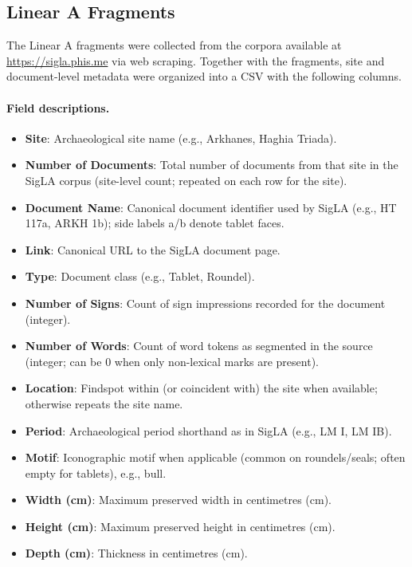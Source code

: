 \subsection{Linear A Fragments}
The Linear A fragments were collected from the corpora available at \url{https://sigla.phis.me} via web scraping.
Together with the fragments, site and document-level metadata were organized into a CSV with the following columns.

\paragraph{Field descriptions.}
\begin{itemize}
    \item \textbf{Site}: Archaeological site name (e.g., Arkhanes, Haghia Triada).
    \item \textbf{Number of Documents}: Total number of documents from that site in the  SigLA corpus (site-level count; repeated on each row for the site).
    \item \textbf{Document Name}: Canonical document identifier used by  SigLA (e.g., HT 117a, ARKH 1b); side labels a/b denote tablet faces.
    \item \textbf{Link}: Canonical URL to the  SigLA document page.
    \item \textbf{Type}: Document class (e.g., Tablet, Roundel).
    \item \textbf{Number of Signs}: Count of sign impressions recorded for the document (integer).
    \item \textbf{Number of Words}: Count of word tokens as segmented in the source (integer; can be 0 when only non-lexical marks are present).
    \item \textbf{Location}: Findspot within (or coincident with) the site when available; otherwise repeats the site name.
    \item \textbf{Period}: Archaeological period shorthand as in  SigLA (e.g., LM I, LM IB).
    \item \textbf{Motif}: Iconographic motif when applicable (common on roundels/seals; often empty for tablets), e.g., bull.
    \item \textbf{Width (cm)}: Maximum preserved width in centimetres (cm).
    \item \textbf{Height (cm)}: Maximum preserved height in centimetres (cm).
    \item \textbf{Depth (cm)}: Thickness in centimetres (cm).
\end{itemize}

